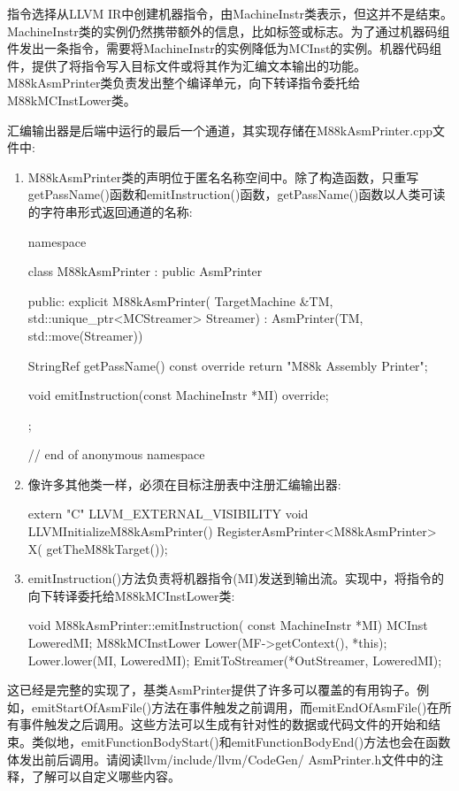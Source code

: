 指令选择从LLVM IR中创建机器指令，由MachineInstr类表示，但这并不是结束。MachineInstr类的实例仍然携带额外的信息，比如标签或标志。为了通过机器码组件发出一条指令，需要将MachineInstr的实例降低为MCInst的实例。机器代码组件，提供了将指令写入目标文件或将其作为汇编文本输出的功能。M88kAsmPrinter类负责发出整个编译单元，向下转译指令委托给M88kMCInstLower类。

汇编输出器是后端中运行的最后一个通道，其实现存储在M88kAsmPrinter.cpp文件中:

\begin{enumerate}
\item
M88kAsmPrinter类的声明位于匿名名称空间中。除了构造函数，只重写getPassName()函数和emitInstruction()函数，getPassName()函数以人类可读的字符串形式返回通道的名称:

\begin{cpp}
namespace {
class M88kAsmPrinter : public AsmPrinter {
public:
    explicit M88kAsmPrinter(
        TargetMachine &TM,
        std::unique_ptr<MCStreamer> Streamer)
        : AsmPrinter(TM, std::move(Streamer)) {}

    StringRef getPassName() const override {
        return "M88k Assembly Printer";
    }

    void emitInstruction(const MachineInstr *MI) override;
};
} // end of anonymous namespace
\end{cpp}

\item
像许多其他类一样，必须在目标注册表中注册汇编输出器:

\begin{cpp}
extern "C" LLVM_EXTERNAL_VISIBILITY void
LLVMInitializeM88kAsmPrinter() {
    RegisterAsmPrinter<M88kAsmPrinter> X(
        getTheM88kTarget());
}
\end{cpp}

\item
emitInstruction()方法负责将机器指令(MI)发送到输出流。实现中，将指令的向下转译委托给M88kMCInstLower类:

\begin{cpp}
void M88kAsmPrinter::emitInstruction(
        const MachineInstr *MI) {
    MCInst LoweredMI;
    M88kMCInstLower Lower(MF->getContext(), *this);
    Lower.lower(MI, LoweredMI);
    EmitToStreamer(*OutStreamer, LoweredMI);
}
\end{cpp}
\end{enumerate}

这已经是完整的实现了，基类AsmPrinter提供了许多可以覆盖的有用钩子。例如，emitStartOfAsmFile()方法在事件触发之前调用，而emitEndOfAsmFile()在所有事件触发之后调用。这些方法可以生成有针对性的数据或代码文件的开始和结束。类似地，emitFunctionBodyStart()和emitFunctionBodyEnd()方法也会在函数体发出前后调用。请阅读llvm/include/llvm/CodeGen/ AsmPrinter.h文件中的注释，了解可以自定义哪些内容。

